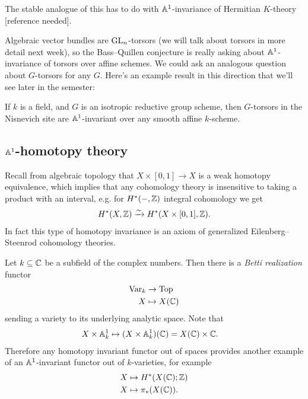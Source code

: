 \documentclass[11pt,openany]{book}
\begin{document}
\begin{remark} The stable analogue of this has to do with $\mathbb{A}^1$-invariance of Hermitian $K$-theory [reference needed].
\end{remark}



Algebraic vector bundles are $\mathrm{GL}_n$-torsors (we will talk about torsors in more detail next week), so the Bass--Quillen conjecture is really asking about $\mathbb{A}^1$-invariance of torsors over affine schemes. We could ask an analogous question about $G$-torsors for any $G$. Here's an example result in this direction that we'll see later in the semester:

\begin{theorem} \cite[1.3]{AHW3} If $k$ is a field, and $G$ is an isotropic reductive group scheme, then $G$-torsors in the Nisnevich site are $\mathbb{A}^1$-invariant over any smooth affine $k$-scheme.
\end{theorem}

\subsection{$\mathbb{A}^1$-homotopy theory}

Recall from algebraic topology that $X \times [0,1] \to X$ is a weak homotopy equivalence, which implies that any cohomology theory is insensitive to taking a product with an interval, e.g. for $H^\ast(-,\mathbb{Z})$ integral cohomology we get
\begin{align*}
    H^\ast(X,\mathbb{Z}) \xrightarrow{\sim} H^\ast(X \times [0,1],\mathbb{Z}).
\end{align*}
In fact this type of homotopy invariance is an axiom of generalized Eilenberg--Steenrod cohomology theories.

\begin{example} Let $k \subseteq \mathbb{C}$ be a subfield of the complex numbers. Then there is a \textit{Betti realization} functor
\begin{align*}
    \mathrm{Var}_k &\to \mathrm{Top} \\
    X &\mapsto X(\mathbb{C})
\end{align*}
sending a variety to its underlying analytic space. Note that
\begin{align*}
    X \times \mathbb{A}^1_k &\mapsto (X \times \mathbb{A}^1_k)(\mathbb{C}) = X(\mathbb{C}) \times \mathbb{C}.
\end{align*}
Therefore any homotopy invariant functor out of spaces provides another example of an $\mathbb{A}^1$-invariant functor out of $k$-varieties, for example
\begin{align*}
    X &\mapsto H^\ast(X(\mathbb{C});\mathbb{Z}) \\
    X &\mapsto \pi_\ast (X(\mathbb{C})).
\end{align*}
\end{example}
\end{document}
